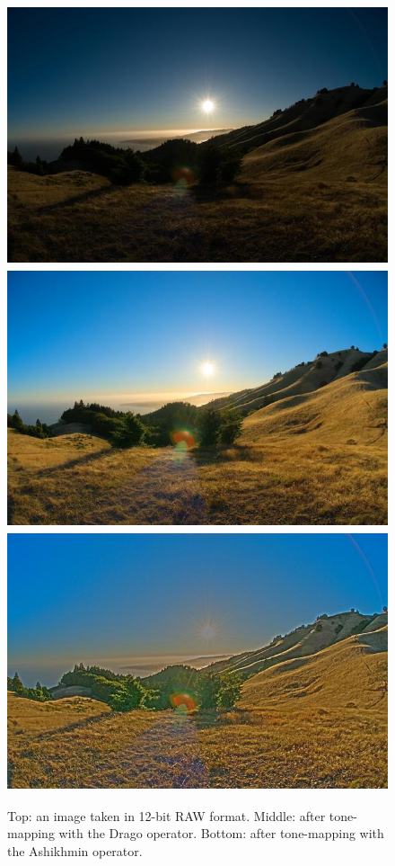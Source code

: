 \begin{figure}[tbp]
\begin{center}
  \includegraphics[height=3in]{images/hdr_original.jpg}
  \includegraphics[height=3in]{images/hdr_drago.jpg}
  \includegraphics[height=3in]{images/hdr_ashikhmin.jpg}
 \end{center}
  \label{fig:tonemapping}
  \caption{Top: an image taken in 12-bit RAW format. Middle: after
           tone-mapping with the Drago operator. Bottom: after
           tone-mapping with the Ashikhmin operator.}
\end{figure}

